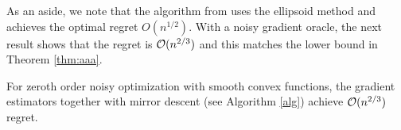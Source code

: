 As an aside, we note that the algorithm from \cite{AgFoHsuKaRa13:SIAM} uses the ellipsoid method and achieves the  optimal
regret $O(n^{1/2})$. 
With a noisy gradient oracle, the next result shows that the regret is  $\mathcal{O}(n^{2/3})$ and this matches the lower bound in Theorem \ref{thm:aaa}.
\begin{theorem}
For zeroth order noisy optimization with smooth convex functions, the gradient estimators together with mirror descent (see Algorithm \ref{alg}) achieve $\mathcal{O}(n^{2/3})$ regret. \end{theorem}




